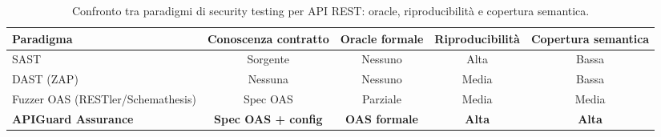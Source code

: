 \begin{table}[ht]
  \centering \small
  \begin{tabularx}{\textwidth}{@{} l C C C C @{}}
    \toprule
    \textbf{Paradigma}                & \textbf{Conoscenza contratto} & \textbf{Oracle formale} & \textbf{Riproducibilità} & \textbf{Copertura semantica} \\
    \midrule
    SAST                              & Sorgente                      & Nessuno                 & Alta                     & Bassa                        \\
    \addlinespace
    DAST (ZAP)                        & Nessuna                       & Nessuno                 & Media                    & Bassa                        \\
    \addlinespace
    Fuzzer OAS (RESTler/Schemathesis) & Spec OAS                      & Parziale                & Media                    & Media                        \\
    \addlinespace
    \textbf{APIGuard Assurance}       & \textbf{Spec OAS + config}    & \textbf{OAS formale}    & \textbf{Alta}            & \textbf{Alta}                \\
    \bottomrule
  \end{tabularx}
  \caption{Confronto tra paradigmi di security testing per \gls{API} REST: oracle, riproducibilità e copertura semantica.}
  \label{tab:testing-comparison}
\end{table}
